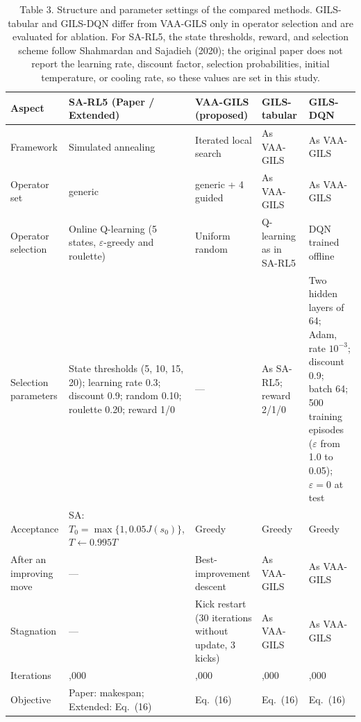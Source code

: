 \documentclass[10pt,a4paper]{article}
\begin{document}
\begin{table}[H]\centering
\caption{Table 3. Structure and parameter settings of the compared methods. GILS-tabular and GILS-DQN differ from VAA-GILS only in operator selection and are evaluated for ablation. For SA-RL5, the state thresholds, reward, and selection scheme follow Shahmardan and Sajadieh (2020); the original paper does not report the learning rate, discount factor, selection probabilities, initial temperature, or cooling rate, so these values are set in this study.}
\label{tab:base}\footnotesize\setlength{\tabcolsep}{3pt}
\begin{tabular}{@{}>{\raggedright\arraybackslash}p{}>{\raggedright\arraybackslash}p{}>{\raggedright\arraybackslash}p{}>{\raggedright\arraybackslash}p{}>{\raggedright\arraybackslash}p{}@{}}
\toprule
Aspect & SA-RL5 (Paper / Extended) & VAA-GILS (proposed) & GILS-tabular & GILS-DQN\\
\midrule
Framework & Simulated annealing & Iterated local search & As VAA-GILS & As VAA-GILS\\
Operator set & 7 generic & 7 generic + 4 guided & As VAA-GILS & As VAA-GILS\\
Operator selection & Online Q-learning (5 states, $\varepsilon$-greedy and roulette) & Uniform random & Q-learning as in SA-RL5 & DQN trained offline\\
Selection parameters & State thresholds (5, 10, 15, 20); learning rate 0.3; discount 0.9; random 0.10; roulette 0.20; reward 1/0 & --- & As SA-RL5; reward 2/1/0 & Two hidden layers of 64; Adam, rate $10^{-3}$; discount 0.9; batch 64; 500 training episodes ($\varepsilon$ from 1.0 to 0.05); $\varepsilon=0$ at test\\
Acceptance & SA: $T_0=\max\{1,0.05J(s_0)\}$, $T\leftarrow0.995T$ & Greedy & Greedy & Greedy\\
After an improving move & --- & Best-improvement descent & As VAA-GILS & As VAA-GILS\\
Stagnation & --- & Kick restart (30 iterations without update, 3 kicks) & As VAA-GILS & As VAA-GILS\\
Iterations & 1,000 & 1,000 & 1,000 & 1,000\\
Objective & Paper: makespan; Extended: Eq.~(16) & Eq.~(16) & Eq.~(16) & Eq.~(16)\\
\bottomrule
\end{tabular}
\end{table}
\end{document}
